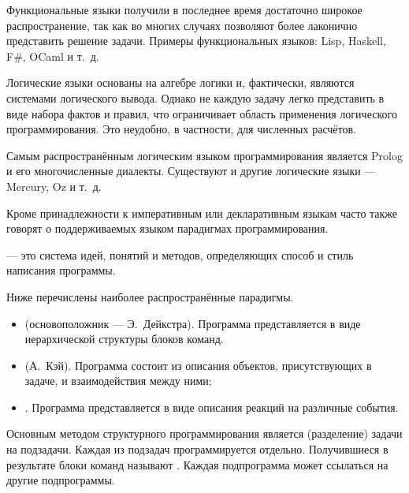 Функциональные языки получили в последнее время достаточно широкое
распространение, так как во многих случаях позволяют более лаконично
представить решение задачи. Примеры функциональных языков: Lisp,
Haskell, F\#, OCaml и т.~д.


Логические языки основаны на алгебре логики и, фактически, являются
системами логического вывода. Однако не каждую задачу легко
представить в виде набора фактов и правил, что ограничивает область
применения логического программирования. Это неудобно, в частности,
для численных расчётов.

Самым распространённым логическим языком программирования является
Prolog и его многочисленные диалекты. Существуют и другие логические
языки — Mercury, Oz и т.~д.


Кроме принадлежности к императивным или декларативным языкам часто
также говорят о поддерживаемых языком парадигмах программирования.

\begin{defn}
   — это
  система идей, понятий и методов, определяющих способ и стиль
  написания программы.
\end{defn}

Ниже перечислены наиболее распространённые парадигмы.

\begin{itemize}
\item {} (основоположник — Э.~Дейкстра). Программа
  представляется в виде иерархической структуры блоков команд.
\item
   (А.~Кэй). Программа состоит из описания
  объектов, присутствующих в задаче, и взаимодействия между ними;
\item
  . Программа представляется в виде описания
  реакций на различные события.
\end{itemize}


Основным методом структурного программирования является
 (разделение) задачи на
подзадачи. Каждая из подзадач программируется отдельно. Получившиеся в
результате блоки команд называют .
Каждая подпрограмма может ссылаться на другие подпрограммы.

